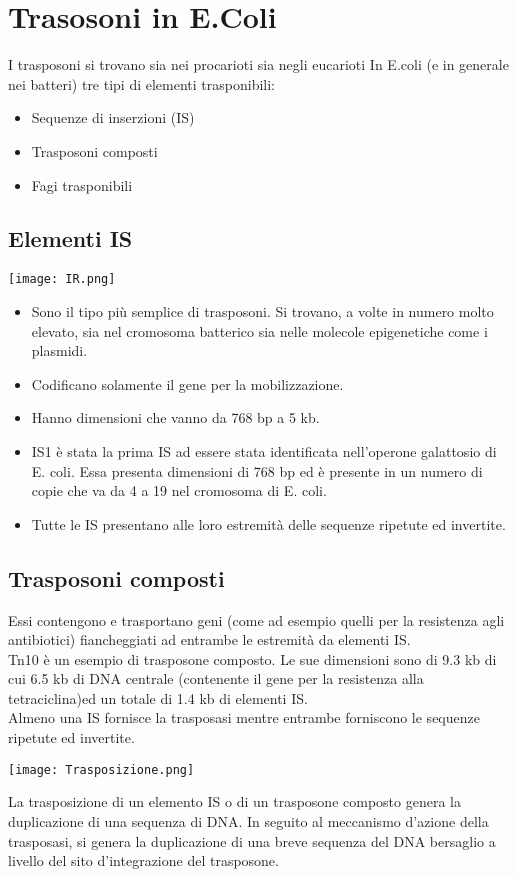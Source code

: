 \documentclass{article}
\begin{document}
\section{Trasosoni in E.Coli}
I trasposoni si trovano sia nei procarioti sia negli eucarioti
In E.coli (e in generale nei batteri) tre tipi di elementi
trasponibili:
\begin{itemize}
    \item Sequenze di inserzioni (IS)
    \item Trasposoni composti
    \item Fagi trasponibili
\end{itemize}
\subsection{Elementi IS}
\begin{center}
    \texttt{[image: IR.png]}
\end{center}
\begin{itemize}
    \item Sono il tipo più semplice di trasposoni. Si trovano, a volte in
    numero molto elevato, sia nel cromosoma batterico sia nelle
    molecole epigenetiche come i plasmidi.
    \item Codificano solamente il gene per la mobilizzazione. 
    \item Hanno dimensioni che vanno da 768 bp a 5 kb.
    \item IS1 è stata la prima IS ad essere stata identificata nell'operone
    galattosio di E. coli. Essa presenta dimensioni di 768 bp ed è
    presente in un numero di copie che va da 4 a 19 nel cromosoma di
    E. coli.
    \item Tutte le IS presentano alle loro estremità delle sequenze ripetute
    ed invertite.
\end{itemize}
\subsection{Trasposoni composti}
Essi contengono e trasportano geni (come ad esempio
quelli per la resistenza agli antibiotici) fiancheggiati ad
entrambe le estremità da elementi IS.\\
Tn10 è un esempio di trasposone composto. Le sue
dimensioni sono di 9.3 kb di cui 6.5 kb di DNA centrale
(contenente il gene per la resistenza alla tetraciclina)ed
un totale di 1.4 kb di elementi IS.\\
Almeno una IS fornisce la trasposasi mentre entrambe
forniscono le sequenze ripetute ed invertite.
\begin{center}
    \texttt{[image: Trasposizione.png]}
\end{center}
La trasposizione di un elemento IS o di un trasposone
composto genera la duplicazione di una sequenza di DNA. In
seguito al meccanismo d'azione della trasposasi, si genera la
duplicazione di una breve sequenza del DNA bersaglio a livello
del sito d'integrazione del trasposone.
\end{document}

